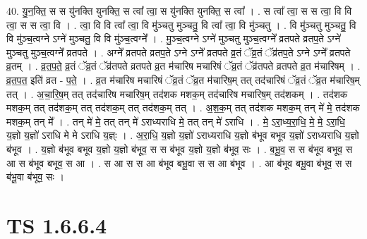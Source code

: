 \documentclass[17pt]{extarticle}
\begin{document}
40. यु॒न॒क्ति॒ स स यु॑नक्ति युनक्ति॒ स त्वा᳚ त्वा॒ स यु॑नक्ति युनक्ति॒ स त्वा᳚ । . स त्वा᳚ त्वा॒ स स त्वा॒ वि वि त्वा॒ स स त्वा॒ वि । . त्वा॒ वि वि त्वा᳚ त्वा॒ वि मु॑ञ्चतु मुञ्चतु॒ वि त्वा᳚ त्वा॒ वि मु॑ञ्चतु । . वि मु॑ञ्चतु मुञ्चतु॒ वि वि मु॑ञ्च॒त्वग्ने ऽग्ने॑ मुञ्चतु॒ वि वि मु॑ञ्च॒त्वग्ने᳚ । . मु॒ञ्च॒त्वग्ने ऽग्ने॑ मुञ्चतु मुञ्च॒त्वग्ने᳚ व्रतपते व्रतप॒ते ऽग्ने॑ मुञ्चतु मुञ्च॒त्वग्ने᳚ व्रतपते । . अग्ने᳚ व्रतपते व्रतप॒ते ऽग्ने ऽग्ने᳚ व्रतपते व्र॒तं ॅव्र॒तं ॅव्र॑तप॒ते ऽग्ने ऽग्ने᳚ व्रतपते व्र॒तम् । . व्र॒त॒प॒ते॒ व्र॒तं ॅव्र॒तं ॅव्र॑तपते व्रतपते व्र॒त म॑चारिष मचारिषं ॅव्र॒तं ॅव्र॑तपते व्रतपते व्र॒त म॑चारिषम् । . व्र॒त॒प॒त॒ इति॑ व्रत - प॒ते॒ । . व्र॒त म॑चारिष मचारिषं ॅव्र॒तं ॅव्र॒त म॑चारिष॒म् तत् तद॑चारिषं ॅव्र॒तं ॅव्र॒त म॑चारिष॒म् तत् । . अ॒चा॒रि॒ष॒म् तत् तद॑चारिष मचारिष॒म् तद॑शक मशक॒म् तद॑चारिष मचारिष॒म् तद॑शकम् । . तद॑शक मशक॒म् तत् तद॑शक॒म् तत् तद॑शक॒म् तत् तद॑शक॒म् तत् । . अ॒श॒क॒म् तत् तद॑शक मशक॒म् तन् मे॑ मे॒ तद॑शक मशक॒म् तन् मे᳚ । . तन् मे॑ मे॒ तत् तन् मे॑ ऽराध्यराधि मे॒ तत् तन् मे॑ ऽराधि । . मे॒ ऽरा॒ध्य॒रा॒धि॒ मे॒ मे॒ ऽरा॒धि॒ य॒ज्ञो य॒ज्ञो॑ ऽराधि मे मे ऽराधि य॒ज्ञ्ः । . अ॒रा॒धि॒ य॒ज्ञो य॒ज्ञो॑ ऽराध्यराधि य॒ज्ञो ब॑भूव बभूव य॒ज्ञो॑ ऽराध्यराधि य॒ज्ञो ब॑भूव । . य॒ज्ञो ब॑भूव बभूव य॒ज्ञो य॒ज्ञो ब॑भूव॒ स स ब॑भूव य॒ज्ञो य॒ज्ञो ब॑भूव॒ सः । . ब॒भू॒व॒ स स ब॑भूव बभूव॒ स आ स ब॑भूव बभूव॒ स आ । . स आ स स आ ब॑भूव बभू॒वा स स आ ब॑भूव । . आ ब॑भूव बभू॒वा ब॑भूव॒ स स ब॑भू॒वा ब॑भूव॒ सः । \newline
\pagebreak
{}
\section*{ TS 1.6.6.4 }
\end{document}
